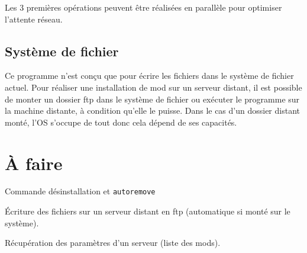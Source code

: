 \documentclass{article}
\begin{document}
Les 3 premières opérations peuvent être réalisées en parallèle pour optimiser l'attente réseau.

\subsection{Système de fichier}
Ce programme n'est conçu que pour écrire les fichiers dans le système de fichier actuel.
Pour réaliser une installation de mod sur un serveur distant, il est possible de monter un dossier ftp dans le système de fichier ou exécuter le programme sur la machine distante, à condition qu'elle le puisse.
Dans le cas d'un dossier distant monté, l'OS s'occupe de tout donc cela dépend de ses capacités.

\newpage
\section{À faire}
Commande désinstallation et \texttt{autoremove}

Écriture des fichiers sur un serveur distant en ftp (automatique si monté sur le système).

Récupération des paramètres d'un serveur (liste des mods).
	
\end{document}
